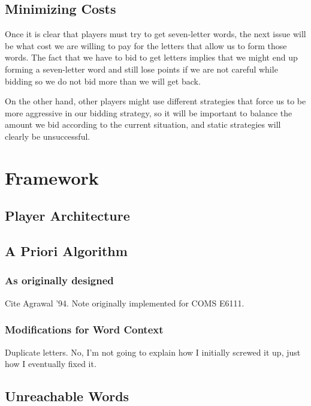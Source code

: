 \documentclass[11pt]{article}
\begin{document}
\subsection{Minimizing Costs}

Once it is clear that players must try to get seven-letter words, the next issue will be what cost we are willing to pay for the letters that allow us to form those words. The fact that we have to bid to get letters implies that we might end up forming a seven-letter word and still lose points if we are not careful while bidding so we do not bid more than we will get back.

On the other hand, other players might use different strategies that force us to be more aggressive in our bidding strategy, so it will be important to balance the amount we bid according to the current situation, and static strategies will clearly be unsuccessful. 

\section{Framework}

\subsection{Player Architecture}

\subsection{A Priori Algorithm} %
\subsubsection{As originally designed}

Cite Agrawal '94.  Note originally implemented for COMS E6111.

\subsubsection{Modifications for Word Context}

Duplicate letters.  No, I'm not going to explain how I initially screwed it up, just how I eventually fixed it.

\subsection{Unreachable Words}
\end{document}
